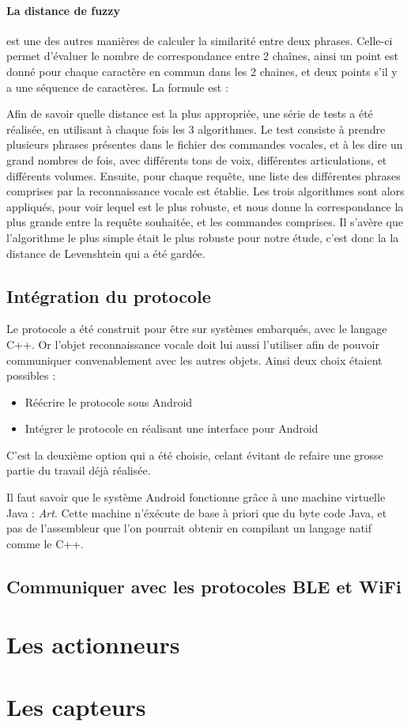 \paragraph{La distance de fuzzy}est une des autres manières de calculer la similarité entre deux phrases. 
Celle-ci permet d'évaluer le nombre de correspondance entre 2 chaînes, ainsi un point est donné pour chaque 
caractère en commun dans les 2 chaines, et deux points s'il y a une séquence de caractères. La formule est :


Afin de savoir quelle distance est la plus appropriée, une série de tests a été réalisée, en utilisant à 
chaque fois les 3 algorithmes. Le test consiste à prendre plusieurs phrases présentes dans le fichier des 
commandes vocales, et à les dire un grand nombres de fois, avec différents tons de voix, différentes 
articulations, et différents volumes. Ensuite, pour chaque requête, une liste des différentes phrases 
comprises par la reconnaissance vocale est établie. Les trois algorithmes sont alors appliqués, pour voir 
lequel est le plus robuste, et nous donne la correspondance la plus grande entre la requête souhaitée, et les 
commandes comprises. Il s'avère que l'algorithme le plus simple  était le plus robuste pour notre étude, 
c'est donc la la distance de Levenshtein qui a été gardée.

	\subsection{Intégration du protocole}
Le protocole a été construit pour être sur systèmes embarqués, avec le langage C++. Or l'objet reconnaissance 
vocale doit lui aussi l'utiliser afin de pouvoir communiquer convenablement avec les autres objets. Ainsi deux 
choix étaient possibles :
\begin{itemize}
 \item Réécrire le protocole sous Android
 \item Intégrer le protocole en réalisant une interface pour Android
\end{itemize}

C'est la deuxième option qui a été choisie, celant évitant de refaire une grosse partie du travail déjà 
réalisée.

Il faut savoir que le système Android fonctionne grâce à une machine virtuelle Java : \emph{Art}. Cette 
machine n'éxécute de base à priori que du byte code Java, et pas de l'assembleur que l'on pourrait 
obtenir en compilant un langage natif comme le C++. 


	\subsection{Communiquer avec les protocoles BLE et WiFi}
\section{Les actionneurs}
\section{Les capteurs}


